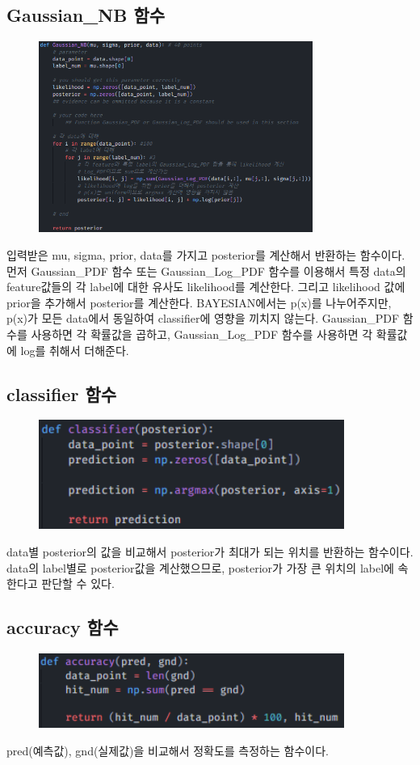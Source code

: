 \documentclass[12pt]{article}
\begin{document}
\subsection{Gaussian\_NB 함수}
\begin{figure}[!h]
	\includegraphics[width=0.8\textwidth]{figures/image07.png}
\end{figure}
입력받은 mu, sigma, prior, data를 가지고 posterior를 계산해서 반환하는 함수이다.
먼저 Gaussian\_PDF 함수 또는 Gaussian\_Log\_PDF 함수를 이용해서
특정 data의 feature값들의 각 label에 대한 유사도 likelihood를 계산한다.
그리고 likelihood 값에 prior을 추가해서 posterior를 계산한다.
BAYESIAN에서는 p(x)를 나누어주지만, p(x)가 모든 data에서 동일하여 classifier에 영향을 끼치지 않는다.
Gaussian\_PDF 함수를 사용하면 각 확률값을 곱하고,
Gaussian\_Log\_PDF 함수를 사용하면 각 확률값에 log를 취해서 더해준다.

\subsection{classifier 함수}
\begin{figure}[!h]
	\includegraphics[width=10cm]{figures/image08.png}
\end{figure}
data별 posterior의 값을 비교해서 posterior가 최대가 되는 위치를 반환하는 함수이다.
data의 label별로 posterior값을 계산했으므로,
posterior가 가장 큰 위치의 label에 속한다고 판단할 수 있다. 

\subsection{accuracy 함수}
\begin{figure}[!h]
	\includegraphics[width=10cm]{figures/image09.png}
\end{figure}
pred(예측값), gnd(실제값)을 비교해서 정확도를 측정하는 함수이다.
\end{document}
